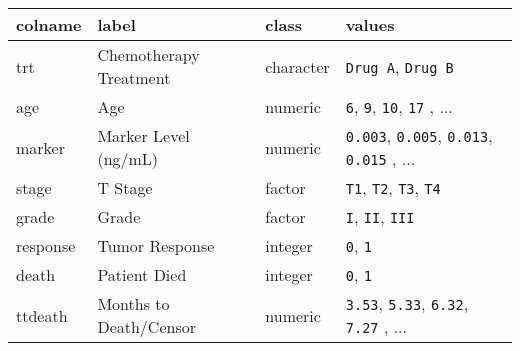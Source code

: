 \captionsetup[table]{labelformat=empty,skip=1pt}
\begin{longtable}{llll}
\toprule
colname & label & class & values \\ 
\midrule
trt & Chemotherapy Treatment & character & \texttt{Drug A}, \texttt{Drug B} \\ 
age & Age & numeric & \texttt{6}, \texttt{9}, \texttt{10}, \texttt{17} , ... \\ 
marker & Marker Level (ng/mL) & numeric & \texttt{0.003}, \texttt{0.005}, \texttt{0.013}, \texttt{0.015} , ... \\ 
stage & T Stage & factor & \texttt{T1}, \texttt{T2}, \texttt{T3}, \texttt{T4} \\ 
grade & Grade & factor & \texttt{I}, \texttt{II}, \texttt{III} \\ 
response & Tumor Response & integer & \texttt{0}, \texttt{1} \\ 
death & Patient Died & integer & \texttt{0}, \texttt{1} \\ 
ttdeath & Months to Death/Censor & numeric & \texttt{3.53}, \texttt{5.33}, \texttt{6.32}, \texttt{7.27} , ... \\ 
\bottomrule
\end{longtable}

